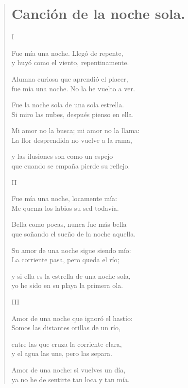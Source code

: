 \documentclass[11pt, portrait, twoside, notitlepage, openright]{book}
\begin{document}
\newpage
\begin{verse}
\begin{center}
\section{Canción de la noche sola.}
\end{center}
\begin{center}
I
\end{center}

Fue mía una noche. Llegó de repente,\\
y huyó como el viento, repentinamente.

Alumna curiosa que aprendió el placer,\\
fue mía una noche. No la he vuelto a ver.

Fue la noche sola de una sola estrella.\\
Si miro las nubes, después pienso en ella.

Mi amor no la busca; mi amor no la llama:\\
La flor desprendida no vuelve a la rama,

y las ilusiones son como un espejo\\
que cuando se empaña pierde su reflejo.

\begin{center}
II
\end{center}

Fue mía una noche, locamente mía:\\
Me quema los labios su sed todavía.

Bella como pocas, nunca fue más bella\\
que soñando el sueño de la noche aquella.

Su amor de una noche sigue siendo mío:\\
La corriente pasa, pero queda el río;

y si ella es la estrella de una noche sola,\\
yo he sido en su playa la primera ola.
\newpage
\begin{center}
III
\end{center}

Amor de una noche que ignoró el hastío:\\
Somos las distantes orillas de un río,

entre las que cruza la corriente clara,\\
y el agua las une, pero las separa.

Amor de una noche: si vuelves un día,\\
ya no he de sentirte tan loca y tan mía.


\end{verse}
\end{document}

